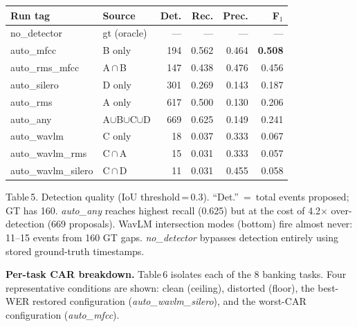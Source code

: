 \documentclass[9pt,twocolumn]{article}
\begin{document}
{\footnotesize\setlength{\tabcolsep}{2.4pt}
\begin{tabularx}{\columnwidth}{lXrrrr}
\toprule
\textbf{Run tag} & \textbf{Source} & \textbf{Det.} & \textbf{Rec.} & \textbf{Prec.} & \textbf{F$_1$} \\
\midrule
no\_detector        & gt (oracle)     & ---  & ---   & ---   & ---   \\
auto\_mfcc          & B only          & 194  & 0.562 & 0.464 & \textbf{0.508} \\
auto\_rms\_mfcc     & A\,$\cap$\,B    & 147  & 0.438 & 0.476 & 0.456 \\
auto\_silero        & D only          & 301  & 0.269 & 0.143 & 0.187 \\
auto\_rms           & A only          & 617  & 0.500 & 0.130 & 0.206 \\
auto\_any           & A$\cup$B$\cup$C$\cup$D & 669 & 0.625 & 0.149 & 0.241 \\
auto\_wavlm         & C only          &  18  & 0.037 & 0.333 & 0.067 \\
auto\_wavlm\_rms    & C\,$\cap$\,A    &  15  & 0.031 & 0.333 & 0.057 \\
auto\_wavlm\_silero & C\,$\cap$\,D    &  11  & 0.031 & 0.455 & 0.058 \\
\bottomrule
\end{tabularx}
}
\vspace{1pt}
{\tiny Table\,5.
Detection quality (IoU threshold\,=\,0.3).  ``Det.''~=~total events
proposed; GT has 160.
\textit{auto\_any} reaches highest recall (0.625) but at the cost of
4.2$\times$ over-detection (669 proposals).
WavLM intersection modes (bottom) fire almost never: 11--15 events
from 160 GT gaps.
\textit{no\_detector} bypasses detection entirely using stored
ground-truth timestamps.}
\vspace{4pt}

\noindent\textbf{Per-task CAR breakdown.}
Table\,6 isolates each of the 8 banking tasks.
Four representative conditions are shown: clean (ceiling),
distorted (floor), the best-WER restored configuration
(\textit{auto\_wavlm\_silero}), and the worst-CAR configuration
(\textit{auto\_mfcc}).
\end{document}
